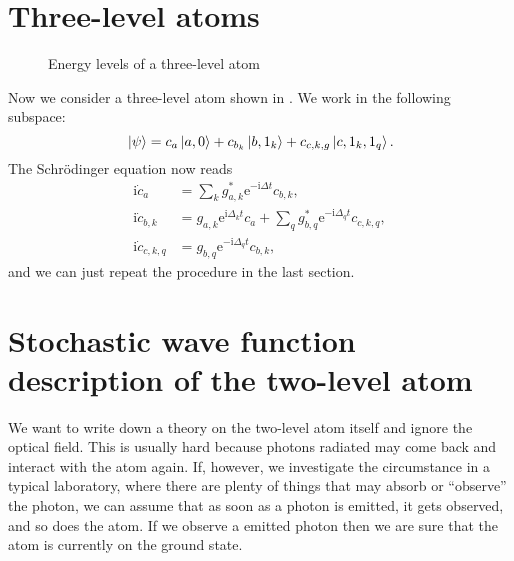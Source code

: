 \documentclass[hyperref, a4paper]{article}
\newcommand*{\ii}{\mathrm{i}}
\newcommand*{\ee}{\mathrm{e}}
\begin{document}
\section{Three-level atoms}

\begin{figure}
    \centering
    
    \caption{Energy levels of a three-level atom}
    \label{fig:three-level-atom}
\end{figure}

Now we consider a three-level atom shown in . We work in the following 
subspace:
\begin{equation}
    \ket*{\psi} = c_a \ket*{a, 0} + c_{b_k} \ket*{b, 1_k} + c_{c, k, g} \ket*{c, 1_k, 1_q}. 
\end{equation}
The Schrödinger equation now reads 
\begin{equation}
    \begin{aligned}
        \ii \dot{c}_a &= \sum_k g_{a, k}^* \ee^{- \ii \Delta t} c_{b, k}, \\
        \ii \dot{c}_{b, k} &= g_{a,k} \ee^{\ii \Delta_k t} c_a 
        + \sum_q g^*_{b,q} \ee^{- \ii \Delta_q t} c_{c, k, q}, \\
        \ii \dot{c}_{c, k, q} &= g_{b,q} \ee^{- \ii \Delta_q t} c_{b, k},
    \end{aligned}
\end{equation} 
and we can just repeat the procedure in the last section.

\section{Stochastic wave function description of the two-level atom}

We want to write down a theory on the two-level atom itself and ignore the optical field. 
This is usually hard because photons radiated may come back and interact with the atom again.
If, however, we investigate the circumstance in a typical laboratory, where there are plenty 
of things that may absorb or ``observe'' the photon, we can assume that as soon as a photon 
is emitted, it gets observed, and so does the atom. If we observe a emitted photon then we are sure 
that the atom is currently on the ground state.
\end{document}
